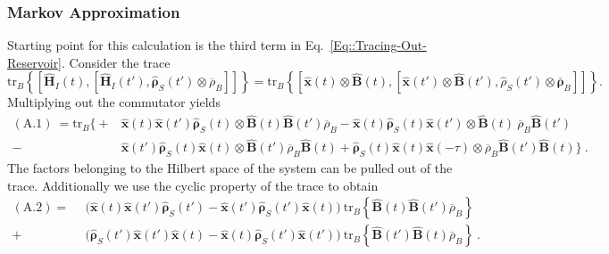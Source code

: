	\subsubsection{Markov Approximation}
	Starting point for this calculation is the third term in Eq.~\eqref{Eq::Tracing-Out-Reservoir}. Consider the trace
	\begin{equation}
			 \text{tr}_B \left\{  \left[\boldsymbol{\hat{H}}_I(t), \left[\boldsymbol{\hat{H}}_I(t'), \boldsymbol{\hat{\rho}}_S(t') \otimes \overline{\rho}_B \right]\right]  \right\} =	\text{tr}_B \left\{  \left[\hat{\boldsymbol{x}}(t) \otimes \hat{\boldsymbol{B}}(t), \left[{\boldsymbol{\hat{x}}}(t') \otimes \boldsymbol{\hat{B}}(t'), {\hat{\rho}}_S(t') \otimes \overline{\boldsymbol{\rho}}_B \right]\right]  \right\}.
	\end{equation}
	Multiplying out the commutator yields
		\begin{equation} \label{Eq::Caldeira-Leggett-Trace}
		\begin{split}
			(\text{A.1})~=\text{tr}_B \bigg \{+&\hat{\boldsymbol{x}}(t) \boldsymbol{\hat{x}}(t') \hat{\boldsymbol{\rho}}_S(t) \otimes \hat{\boldsymbol{B}}(t) \boldsymbol{\hat{B}}(t') \overline{\rho}_B
			- \hat{\boldsymbol{x}}(t)  \hat{\boldsymbol{\rho}}_S(t) \boldsymbol{\hat{x}}(t') \otimes \hat{\boldsymbol{B}}(t)  ~\overline{\rho}_B \boldsymbol{\hat{B}}(t')\\
			-&  \boldsymbol{\hat{x}}(t') \hat{\boldsymbol{\rho}}_S(t) \hat{\boldsymbol{x}}(t) \otimes  	\boldsymbol{\hat{B}}(t') \overline{\rho}_B \hat{\boldsymbol{B}}(t)
			+ \hat{\boldsymbol{\rho}}_S(t) \hat{\boldsymbol{x}}(t) \boldsymbol{\hat{x}}(-\tau)  \otimes \overline{\rho}_B \boldsymbol{\hat{B}}(t') \hat{\boldsymbol{B}}(t)   \bigg \}~.
		\end{split}
	\end{equation}
	The factors belonging to the Hilbert space of the system can be pulled out of the trace. Additionally we use the cyclic property of the trace to obtain
	\begin{equation} \label{Eq::first-appear-bath-corr}
		\begin{split}
			(\text{A}.2) =	~~  &\Big (\hat{\boldsymbol{x}}(t) \boldsymbol{\hat{x}}(t') \hat{\boldsymbol{\rho}}_S(t') - \boldsymbol{\hat{x}}(t') \hat{\boldsymbol{\rho}}_S(t') \hat{\boldsymbol{x}}(t)  \Big) ~ \text{tr}_B \left\{ \hat{\boldsymbol{B}}(t) \boldsymbol{\hat{B}}(t')\overline{\rho}_B \right\} \\
			+& \Big (  \hat{\boldsymbol{\rho}}_S(t') \boldsymbol{\hat{x}}(t') \hat{\boldsymbol{x}}(t)  - \hat{\boldsymbol{x}}(t) \hat{\boldsymbol{\rho}}_S(t') \boldsymbol{\hat{x}}(t')    \Big) ~ \text{tr}_B \left\{ \hat{\boldsymbol{B}}(t') \boldsymbol{\hat{B}}(t)\overline{\rho}_B \right\}  ~.
		\end{split}
	\end{equation}
